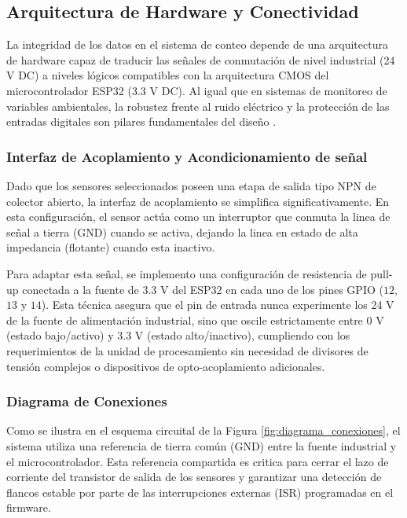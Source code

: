 \documentclass[conference]{IEEEtran}
\begin{document}
\subsection{Arquitectura de Hardware y Conectividad}

La integridad de los datos en el sistema de conteo depende de una arquitectura de hardware capaz de traducir las señales de conmutación de nivel industrial (24 V DC) a niveles lógicos compatibles con la arquitectura CMOS del microcontrolador ESP32 (3.3 V DC). Al igual que en sistemas de monitoreo de variables ambientales, la robustez frente al ruido eléctrico y la protección de las entradas digitales son pilares fundamentales del diseño \cite{sensores_14}.

\subsubsection{Interfaz de Acoplamiento y Acondicionamiento de señal}
Dado que los sensores seleccionados poseen una etapa de salida tipo NPN de colector abierto, la interfaz de acoplamiento se simplifica significativamente. En esta configuración, el sensor actúa como un interruptor que conmuta la linea de señal a tierra (GND) cuando se activa, dejando la linea en estado de alta impedancia (flotante) cuando esta inactivo. 

Para adaptar esta señal, se implemento una configuración de resistencia de pull-up conectada a la fuente de 3.3 V del ESP32 en cada uno de los pines GPIO ($12$, $13$ y $14$). Esta técnica asegura que el pin de entrada nunca experimente los 24 V de la fuente de alimentación industrial, sino que oscile estrictamente entre $0$ V (estado bajo/activo) y $3.3$ V (estado alto/inactivo), cumpliendo con los requerimientos de la unidad de procesamiento sin necesidad de divisores de tensión complejos o dispositivos de opto-acoplamiento adicionales.

\subsubsection{Diagrama de Conexiones}
Como se ilustra en el esquema circuital de la Figura \ref{fig:diagrama_conexiones}, el sistema utiliza una referencia de tierra común (GND) entre la fuente industrial y el microcontrolador. Esta referencia compartida es critica para cerrar el lazo de corriente del transistor de salida de los sensores y garantizar una detección de flancos estable por parte de las interrupciones externas (ISR) programadas en el firmware.
\end{document}

